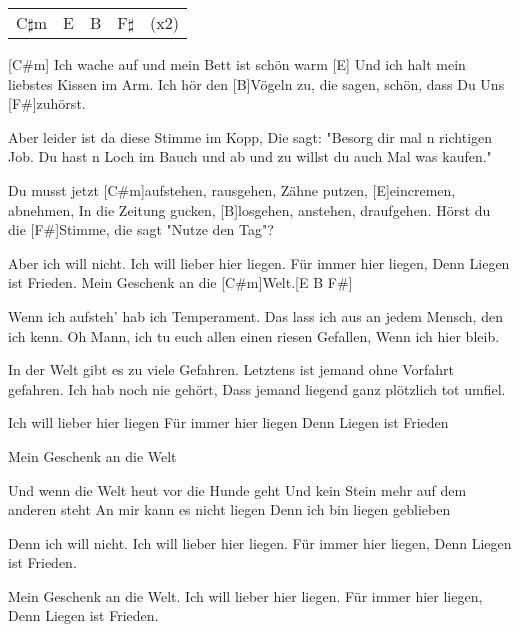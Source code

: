 

\begin{guitar}
	{\footnotesize\begin{tabular}{l|l|l|l l}
			C$\sharp$m & E & B & F$\sharp$ & (x2)
	\end{tabular}}
	
	[C#m] Ich wache auf und mein Bett ist schön warm
	[E] Und ich halt mein liebstes Kissen im Arm.
	Ich hör den [B]Vögeln zu, die sagen, schön, dass Du
	Uns [F#]zuhörst.

	Aber leider ist da diese Stimme im Kopp,
	Die sagt: "Besorg dir mal n richtigen Job.
	Du hast n Loch im Bauch und ab und zu willst du auch
	Mal was kaufen."
	
	Du musst jetzt [C#m]aufstehen, rausgehen,
	Zähne putzen, [E]eincremen, abnehmen,
	In die Zeitung gucken, [B]losgehen, anstehen, draufgehen.
	Hörst du die [F#]Stimme, die sagt "Nutze den Tag"?
	
	Aber ich will nicht.
	Ich will lieber hier liegen.
	Für immer hier liegen,
	Denn Liegen ist Frieden.
	Mein Geschenk an die [C#m]Welt.[E B F#]{}
	
	Wenn ich aufsteh' hab ich Temperament.
	Das lass ich aus an jedem Mensch, den ich kenn.
	Oh Mann, ich tu euch allen einen riesen Gefallen,
	Wenn ich hier bleib.
	
	In der Welt gibt es zu viele Gefahren.
	Letztens ist jemand ohne Vorfahrt gefahren.
	Ich hab noch nie gehört,
	Dass jemand liegend ganz plötzlich tot umfiel.
	
	 
	
	Ich will lieber hier liegen
	Für immer hier liegen
	Denn Liegen ist Frieden
	
	Mein Geschenk an die Welt
	
	Und wenn die Welt heut vor die Hunde geht
	Und kein Stein mehr auf dem anderen steht
	An mir kann es nicht liegen
	Denn ich bin liegen geblieben
	
	Denn ich will nicht.
	Ich will lieber hier liegen.
	Für immer hier liegen,
	Denn Liegen ist Frieden.
	
	Mein Geschenk an die Welt.
	Ich will lieber hier liegen.
	Für immer hier liegen,
	Denn Liegen ist Frieden.
\end{guitar}
